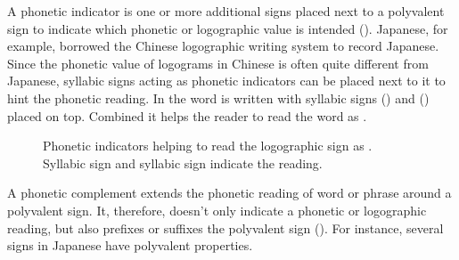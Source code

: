 \documentclass[../main.tex]{subfiles}
\begin{document}
A phonetic indicator is one or more additional signs placed next to a polyvalent sign to
indicate which phonetic or logographic value is intended (\cite[56-57]{whittaker2009}).
Japanese, for example, borrowed the Chinese logographic writing system to record Japanese.
Since the phonetic value of logograms in Chinese is often quite different from Japanese, 
syllabic signs acting as phonetic indicators can be placed next to it to hint the phonetic reading.
In  the word  is written with syllabic signs 
 () and  ()
placed on top.
Combined it helps the reader to read the word as .
\begin{figure}[h!]
    \centering
    \caption[Japanese phonetic indicators]{Phonetic indicators helping to read the 
             logographic sign  as .\\
            Syllabic sign   and 
            syllabic sign   indicate the reading.}
\end{figure}
A phonetic complement extends the phonetic reading of word or phrase around a polyvalent sign.
It, therefore, doesn't only indicate a phonetic or logographic reading, but also prefixes or
suffixes the polyvalent sign (\cite[56-57]{whittaker2009}).
For instance, several signs in Japanese have polyvalent properties.
\end{document}
